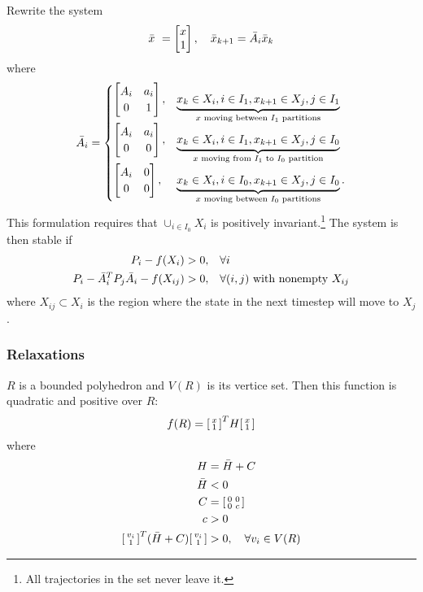 Rewrite the system
%
\begin{equation}
  \bar{x} = \bmat{x \\ 1}, \quad \bar{x}_{k+1} = \bar{A}_i \bar{x}_k
\end{equation}
%
where
%
\begin{equation}
  \bar{A}_i =
  \begin{cases}
    \begin{bmatrix} A_i & a_i \\ 0 & 1 \end{bmatrix},&
    \underbrace{x_k \in X_i, i \in I_1, x_{k+1} \in X_j, j \in I_1}
              _{x \text{ moving between } I_1 \text{ partitions}} \\
    \begin{bmatrix} A_i & a_i \\ 0 & 0 \end{bmatrix},&
    \underbrace{x_k \in X_i, i \in I_1, x_{k+1} \in X_j, j \in I_0}
              _{x \text{ moving from } I_1 \text{ to } I_0 \text{ partition}} \\
    \begin{bmatrix} A_i & 0 \\ 0 & 0 \end{bmatrix},&
    \underbrace{x_k \in X_i, i \in I_0, x_{k+1} \in X_j, j \in I_0}
              _{x \text{ moving between } I_0 \text{ partitions}}.
  \end{cases}
\end{equation}
%
This formulation requires that $\cup_{i \in I_0} X_i$ is positively invariant.\footnote{All trajectories in the set never leave it.} The system is then stable if
%
\begin{equation}
  \begin{split}
    P_i - f(X_i) > 0,\quad & \forall i \\
    P_i - \bar{A}_i^{T} P_j \bar{A}_i - f(X_{ij}) > 0,\quad & \forall (i,j) \mbox{ with nonempty } X_{ij}
  \end{split}
\end{equation}
%
where $X_{ij} \subset X_i$ is the region where the state in the next timestep will move to $X_j$.

\subsubsection{Relaxations}
$R$ is a bounded polyhedron and $V(R)$ is its vertice set. Then this function is quadratic and positive over $R$:
\begin{equation}
  f(R) = \begin{bsmallmatrix} x \\ 1 \end{bsmallmatrix}^{T} H \begin{bsmallmatrix} x \\ 1 \end{bsmallmatrix}
\end{equation}
%
where
%
\begin{equation}
  \begin{split}
    H &= \bar{H} + C \\
    \bar{H} &< 0 \\
    C &= \begin{bsmallmatrix} 0 & 0 \\ 0 & c \end{bsmallmatrix} \\
    c &> 0 \\
    \begin{bsmallmatrix} v_i \\ 1 \end{bsmallmatrix}^{T} (\bar{H} + C) \begin{bsmallmatrix} v_i \\ 1 \end{bsmallmatrix} &> 0,\quad \forall v_i \in V(R)
  \end{split}
\end{equation}
